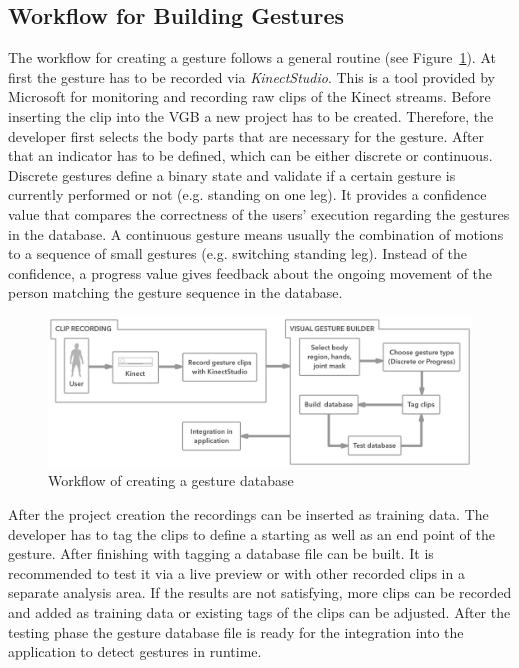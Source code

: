 \subsection{Workflow for Building Gestures}
The workflow for creating a gesture follows a general routine (see Figure~\ref{fig:5_3_gestureCreation}).
At first the gesture has to be recorded via \textit{KinectStudio}.
This is a tool provided by Microsoft for monitoring and recording raw clips of the Kinect streams.
Before inserting the clip into the VGB a new project has to be created.
Therefore, the developer first selects the body parts that are necessary for the gesture.
After that an indicator has to be defined, which can be either discrete or continuous.
Discrete gestures define a binary state and validate if a certain gesture is currently performed or not (e.g. standing on one leg).
It provides a confidence value that compares the correctness of the users' execution regarding the gestures in the database.
A continuous gesture means usually the combination of motions to a sequence of small gestures (e.g. switching standing leg).
Instead of the confidence, a progress value gives feedback about the ongoing movement of the person matching the gesture sequence in the database.
\begin{figure}[htb]
	\centering
	\begin{minipage}[t]{1\linewidth}
		\centering
		\includegraphics[width=1\linewidth]{Pictures/5_3_gestureCreation}
		\caption{Workflow of creating a gesture database}
		\label{fig:5_3_gestureCreation}
	\end{minipage}
\end{figure}

After the project creation the recordings can be inserted as training data.
The developer has to tag the clips to define a starting as well as an end point of the gesture.
After finishing with tagging a database file can be built.
It is recommended to test it via a live preview or with other recorded clips in a separate analysis area.
If the results are not satisfying, more clips can be recorded and added as training data or existing tags of the clips can be adjusted.
After the testing phase the gesture database file is ready for the integration into the application to detect gestures in runtime. %
